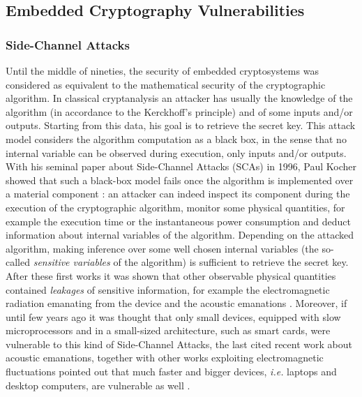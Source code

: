 \subsection{Embedded Cryptography Vulnerabilities}\label{sec:vulnerabilities}
\subsubsection{Side-Channel Attacks}
Until the middle of nineties, the security of embedded cryptosystems was considered as equivalent to the mathematical security of the cryptographic algorithm. In classical cryptanalysis an attacker has usually the knowledge of the algorithm (in accordance to the Kerckhoff's principle) and of some inputs and/or outputs. Starting from this data, his goal is to retrieve the secret key. This attack model considers the algorithm computation as a black box, in the sense that no internal variable can be observed during execution, only inputs and/or outputs. With his seminal paper about Side-Channel Attacks (SCAs) in 1996, Paul Kocher showed that such a black-box model fails once the algorithm is implemented over a material component \cite{kocher1996timing}: an attacker can indeed inspect its component during the execution of the cryptographic algorithm, monitor some physical quantities, for example the execution time \cite{kocher1996timing} or the instantaneous power consumption \cite{kocher1999differential} and deduct information about internal variables of the algorithm. Depending on the attacked algorithm, making inference over some well chosen internal variables (the so-called \emph{sensitive variables} of the algorithm) is sufficient to retrieve the secret key. After these first works it was shown that other observable physical quantities contained \emph{leakages} of sensitive information, for example the electromagnetic radiation emanating from the device \cite{gandolfi2001electromagnetic,quisquater2001electromagnetic} and the acoustic emanations \cite{genkin2014rsa}. Moreover, if until few years ago it was thought that only small devices, equipped with slow microprocessors and in a small-sized architecture, such as smart cards, were vulnerable to this kind of Side-Channel Attacks, the last cited recent work about acoustic emanations, together with other works exploiting electromagnetic fluctuations pointed out that much faster and bigger devices, \emph{i.e.} laptops and desktop computers, are vulnerable as well \cite{genkin2015stealing,genkin2015get,genkin2016ecdh}.

